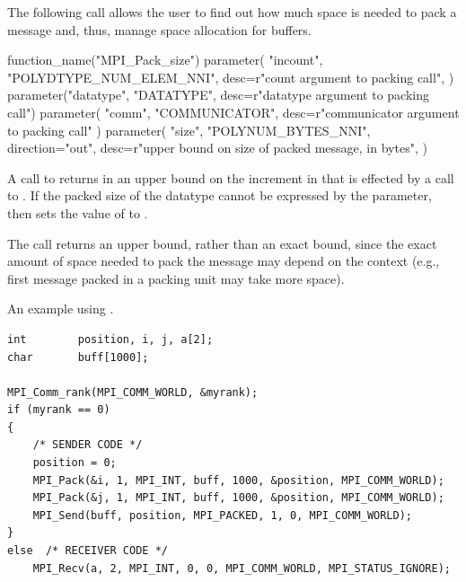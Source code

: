 The following call allows the user to find out how much space is
needed to pack a message and, thus, manage space allocation for
buffers.

\begin{mpi-binding}
    function_name("MPI_Pack_size")
    parameter(
        "incount",
        "POLYDTYPE_NUM_ELEM_NNI",
        desc=r"count argument to packing call",
    )
    parameter("datatype", "DATATYPE", desc=r"datatype argument to packing call")
    parameter(
        "comm", "COMMUNICATOR", desc=r"communicator argument to packing call"
    )
    parameter(
        "size",
        "POLYNUM_BYTES_NNI",
        direction="out",
        desc=r"upper bound on size of packed message, in bytes",
    )
\end{mpi-binding}

A call to 
returns in  an upper bound on the increment in 
that is effected by a call to .
If the packed size of the datatype cannot be expressed by the 
parameter, then  sets the value of  to
.

\begin{rationale}
The call returns an upper bound, rather than an exact bound, since the
exact amount of space needed to pack the message may depend on the
context (e.g., first message packed in a packing unit may take more
space).
\end{rationale}


\begin{example}
\label{pt2pt-exJJ}
%
An example using .
\begin{lstlisting}[language={[MPI]C}]
int        position, i, j, a[2];
char       buff[1000];

MPI_Comm_rank(MPI_COMM_WORLD, &myrank);
if (myrank == 0)
{
    /* SENDER CODE */
    position = 0;
    MPI_Pack(&i, 1, MPI_INT, buff, 1000, &position, MPI_COMM_WORLD);
    MPI_Pack(&j, 1, MPI_INT, buff, 1000, &position, MPI_COMM_WORLD);
    MPI_Send(buff, position, MPI_PACKED, 1, 0, MPI_COMM_WORLD);
}
else  /* RECEIVER CODE */
    MPI_Recv(a, 2, MPI_INT, 0, 0, MPI_COMM_WORLD, MPI_STATUS_IGNORE);
\end{lstlisting}
\end{example}



